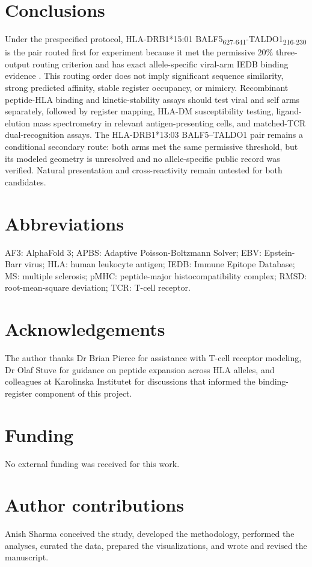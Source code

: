 \documentclass[11pt]{article}
\newcommand{\pep}[2]{#1\textsubscript{#2}}
\begin{document}
\section{Conclusions}
Under the prespecified protocol, HLA-DRB1*15:01 \pep{BALF5}{627-641}-\pep{TALDO1}{216-230} is the pair routed first for experiment because it met the permissive 20\% three-output routing criterion and has exact allele-specific viral-arm IEDB binding evidence \cite{iedb,hansen}. This routing order does not imply significant sequence similarity, strong predicted affinity, stable register occupancy, or mimicry. Recombinant peptide-HLA binding and kinetic-stability assays should test viral and self arms separately, followed by register mapping, HLA-DM susceptibility testing, ligand-elution mass spectrometry in relevant antigen-presenting cells, and matched-TCR dual-recognition assays. The HLA-DRB1*13:03 BALF5--TALDO1 pair remains a conditional secondary route: both arms met the same permissive threshold, but its modeled geometry is unresolved and no allele-specific public record was verified. Natural presentation and cross-reactivity remain untested for both candidates.
\section{Abbreviations}
AF3: AlphaFold 3; APBS: Adaptive Poisson-Boltzmann Solver; EBV: Epstein-Barr virus; HLA: human leukocyte antigen; IEDB: Immune Epitope Database; MS: multiple sclerosis; pMHC: peptide-major histocompatibility complex; RMSD: root-mean-square deviation; TCR: T-cell receptor.

\section*{Acknowledgements}
The author thanks Dr Brian Pierce for assistance with T-cell receptor modeling, Dr Olaf Stuve for guidance on peptide expansion across HLA alleles, and colleagues at Karolinska Institutet for discussions that informed the binding-register component of this project.

\section*{Funding}
No external funding was received for this work.

\section*{Author contributions}
Anish Sharma conceived the study, developed the methodology, performed the analyses, curated the data, prepared the visualizations, and wrote and revised the manuscript.
\end{document}
